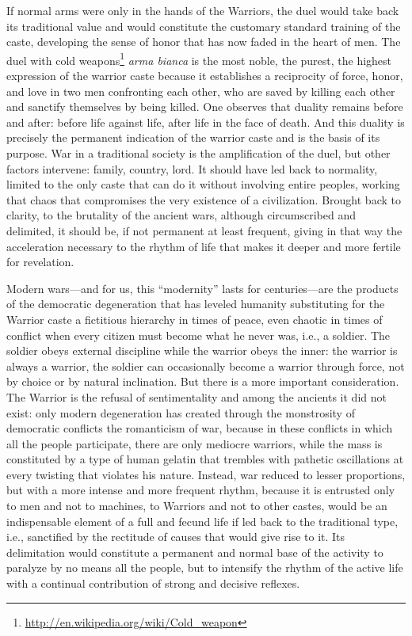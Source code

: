 If normal arms were only in the hands of the Warriors, the duel would take back its traditional value and would constitute the customary standard training of the caste, developing the sense of honor that has now faded in the heart of men. The duel with cold weapons\footnote{\url{http://en.wikipedia.org/wiki/Cold_weapon}} \emph{arma bianca} is the most noble, the purest, the highest expression of the warrior caste because it establishes a reciprocity of force, honor, and love in two men confronting each other, who are saved by killing each other and sanctify themselves by being killed. One observes that duality remains before and after: before life against life, after life in the face of death. And this duality is precisely the permanent indication of the warrior caste and is the basis of its purpose. War in a traditional society is the amplification of the duel, but other factors intervene: family, country, lord. It should have led back to normality, limited to the only caste that can do it without involving entire peoples, working that chaos that compromises the very existence of a civilization. Brought back to clarity, to the brutality of the ancient wars, although circumscribed and delimited, it should be, if not permanent at least frequent, giving in that way the acceleration necessary to the rhythm of life that makes it deeper and more fertile for revelation.

Modern wars---and for us, this ``modernity'' lasts for centuries---are the products of the democratic degeneration that has leveled humanity substituting for the Warrior caste a fictitious hierarchy in times of peace, even chaotic in times of conflict when every citizen must become what he never was, i.e., a soldier. The soldier obeys external discipline while the warrior obeys the inner: the warrior is always a warrior, the soldier can occasionally become a warrior through force, not by choice or by natural inclination. But there is a more important consideration. The Warrior is the refusal of sentimentality and among the ancients it did not exist: only modern degeneration has created through the monstrosity of democratic conflicts the romanticism of war, because in these conflicts in which all the people participate, there are only mediocre warriors, while the mass is constituted by a type of human gelatin that trembles with pathetic oscillations at every twisting that violates his nature. Instead, war reduced to lesser proportions, but with a more intense and more frequent rhythm, because it is entrusted only to men and not to machines, to Warriors and not to other castes, would be an indispensable element of a full and fecund life if led back to the traditional type, i.e., sanctified by the rectitude of causes that would give rise to it. Its delimitation would constitute a permanent and normal base of the activity to paralyze by no means all the people, but to intensify the rhythm of the active life with a continual contribution of strong and decisive reflexes.

